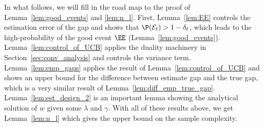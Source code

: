 \documentclass{article}
\newcommand{\lalit}[1]{\textcolor{blue}{}}
\newcommand{\1}{\mathbf{1}}
\begin{document}

In what follows, we will fill in the road map to the proof of Lemma~\ref{lem:good_events} and \ref{lem:n_l}. First, Lemma~\ref{lem:EE} controls the estimation error of the gap and shows that $\P(\mathcal{E}_{\ell}) > 1-\delta_{\ell}$, which leads to the high-probability of the good event $\EE$ (Lemma~\ref{lem:good_events}). Lemma~\ref{lem:control_of_UCB} applies the duality machinery in Section~\ref{sec:conv_analysis} and controls the variance term. Lemma~\ref{lem:emp_gaps} applies the result of Lemma~\ref{lem:control_of_UCB} and shows an upper bound for the difference between estimate gap and the true gap, which is a very similar result of Lemma~\ref{lem:diff_emp_true_gap}. Lemma~\ref{lem:est_design_2} is an important lemma showing the analytical solution of $w$ given some $\lambda$ and $\gamma$. With all of these results above, we get Lemma~\ref{lem:n_l} which gives the upper bound on the sample complexity.
 
\end{document}

